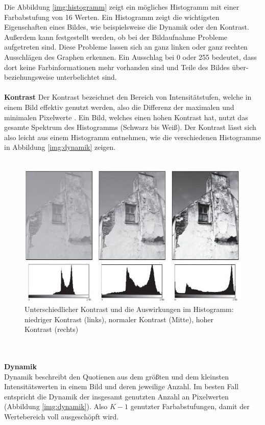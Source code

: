 Die Abbildung \ref{img:histogramm} zeigt ein mögliches Histogramm mit einer Farbabstufung von 16 Werten. Ein Histogramm zeigt die wichtigsten Eigenschaften eines Bildes, wie beispielsweise die Dynamik oder den Kontrast. Außerdem kann festgestellt werden, ob bei der Bildaufnahme Probleme aufgetreten sind. Diese Probleme lassen sich an ganz linken oder ganz rechten Ausschlägen des Graphen erkennen. Ein Ausschlag bei 0 oder 255 bedeutet, dass dort keine Farbinformationen mehr vorhanden sind und Teile des Bildes über- beziehungsweise unterbelichtet sind.\\\\
\textbf{Kontrast}\label{s.kontrast}
Der Kontrast bezeichnet den Bereich von Intensitätstufen, welche in einem Bild effektiv genutzt werden, also die Differenz der maximalen und minimalen Pixelwerte \cite[44]{burger2009digitale}. Ein Bild, welches einen hohen Kontrast hat, nutzt das gesamte Spektrum des Histogramms (Schwarz bis Weiß). Der Kontrast lässt sich also leicht aus einem Histogramm entnehmen, wie die verschiedenen Histogramme in Abbildung \ref{img:dynamik} zeigen.\\\\
  \begin{figure}
    [h]
    \centering
    \includegraphics[scale=0.7]{Sources/kontrast.JPG}
    \caption{Unterschiedlicher Kontrast und die Auswirkungen im Histogramm: niedriger Kontrast (links), normaler Kontrast (Mitte), hoher Kontrast (rechts)\cite[45]{burger2009digitale}}
    \label{img:kontrast}
  \end{figure}\\\\
\textbf{Dynamik}\label{s.dynamik}\\
Dynamik beschreibt den Quotienen aus dem größten und dem kleinsten Intensitätswerten in einem Bild und deren jeweilige Anzahl\cite[44]{burger2009digitale}. Im besten Fall entspricht die Dynamik der insgesamt genutzten Anzahl an Pixelwerten (Abbildung \ref{img:dynamik}). Also $K-1$ genutzter Farbabstufungen, damit der Wertebereich voll ausgeschöpft wird.\\
